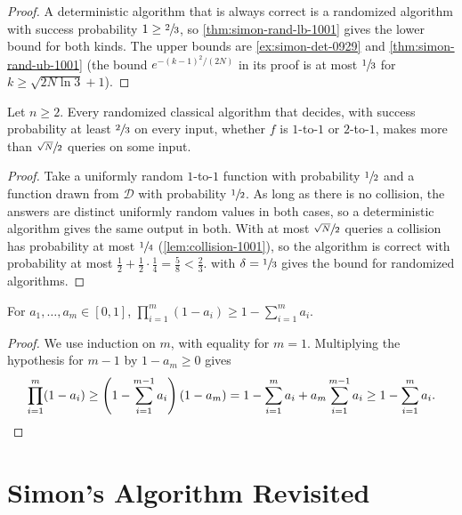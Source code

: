 \begin{proof}
    A deterministic algorithm that is always correct is a randomized algorithm with success
    probability $1 \geq \sfrac{2}{3}$, so \cref{thm:simon-rand-lb-1001} gives the lower bound for both
    kinds. The upper bounds are \cref{ex:simon-det-0929} and \cref{thm:simon-rand-ub-1001} (the
    bound $e^{-(k-1)^2/(2N)}$ in its proof is at most $\sfrac{1}{3}$ for $k \geq \sqrt{2N \ln 3} + 1$).
\end{proof}

\begin{corollary}\label{cor:simon-decision-1001}
    Let $n \geq 2$. Every randomized classical algorithm that decides, with success probability at
    least $\sfrac{2}{3}$ on every input, whether $f$ is $1$-to-$1$ or $2$-to-$1$, makes more than
    $\sfrac{\sqrt{N}}{2}$ queries on some input.
\end{corollary}

\begin{proof}
    Take a uniformly random $1$-to-$1$ function with probability $\sfrac{1}{2}$ and a function drawn
    from $\mathcal{D}$ with probability $\sfrac{1}{2}$. As long as there is no collision, the answers
    are distinct uniformly random values in both cases, so a deterministic algorithm gives the same
    output in both. With at most $\sfrac{\sqrt{N}}{2}$ queries a collision has probability at most
    $\sfrac{1}{4}$ (\cref{lem:collision-1001}), so the algorithm is correct with probability at most
    $\frac{1}{2} + \frac{1}{2} \cdot \frac{1}{4} = \frac{5}{8} < \frac{2}{3}$. 
    with $\delta = \sfrac{1}{3}$ gives the bound for randomized algorithms.
\end{proof}

\begin{claim}\label{lem:prodsum-1001}
    For $a_1, \dots, a_m \in [0, 1]$, $\prod_{i=1}^{m} (1 - a_i) \geq 1 - \sum_{i=1}^{m} a_i$.
\end{claim}

\begin{proof}
    We use induction on $m$, with equality for $m = 1$. Multiplying the hypothesis for $m - 1$ by
    $1 - a_m \geq 0$ gives
    \[\prod_{i=1}^{m} (1 - a_i) \geq \left(1 - \sum_{i=1}^{m-1} a_i\right)(1 - a_m)
        = 1 - \sum_{i=1}^{m} a_i + a_m \sum_{i=1}^{m-1} a_i \geq 1 - \sum_{i=1}^{m} a_i. \qedhere\]
\end{proof}

\section{Simon's Algorithm Revisited}

